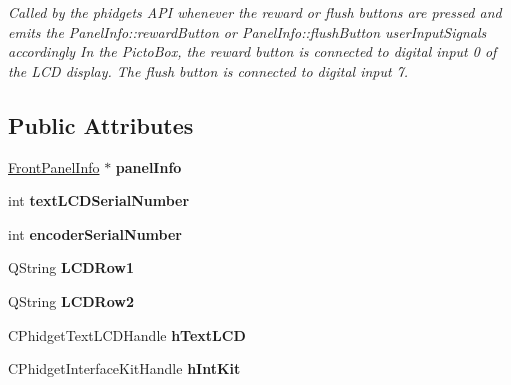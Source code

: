 \begin{DoxyCompactItemize}
\begin{DoxyCompactList}\small\item\em Called by the phidgets A\-P\-I whenever the reward or flush buttons are pressed and emits the Panel\-Info\-::reward\-Button or Panel\-Info\-::flush\-Button user\-Input\-Signals accordingly  In the Picto\-Box, the reward button is connected to digital input 0 of the L\-C\-D display. The flush button is connected to digital input 7. \end{DoxyCompactList}\end{DoxyCompactItemize}
\subsection*{Public Attributes}
\begin{DoxyCompactItemize}
\item 
\hypertarget{class_phidgets_af8d44bc3997410a4684134cfa4b7f96d}{\hyperlink{class_front_panel_info}{Front\-Panel\-Info} $\ast$ {\bfseries panel\-Info}}\label{class_phidgets_af8d44bc3997410a4684134cfa4b7f96d}

\item 
\hypertarget{class_phidgets_a0384f8ff8d21e86205b57c331109378c}{int {\bfseries text\-L\-C\-D\-Serial\-Number}}\label{class_phidgets_a0384f8ff8d21e86205b57c331109378c}

\item 
\hypertarget{class_phidgets_a1bbdcecfa457f37353ef961c6f899b33}{int {\bfseries encoder\-Serial\-Number}}\label{class_phidgets_a1bbdcecfa457f37353ef961c6f899b33}

\item 
\hypertarget{class_phidgets_ad992b047164dda94ced4513033bf3dd3}{Q\-String {\bfseries L\-C\-D\-Row1}}\label{class_phidgets_ad992b047164dda94ced4513033bf3dd3}

\item 
\hypertarget{class_phidgets_a1093ada8d8ae814ff08d42574e1391c0}{Q\-String {\bfseries L\-C\-D\-Row2}}\label{class_phidgets_a1093ada8d8ae814ff08d42574e1391c0}

\item 
\hypertarget{class_phidgets_ae09bd5feecd96927e72c64a8c9d57715}{C\-Phidget\-Text\-L\-C\-D\-Handle {\bfseries h\-Text\-L\-C\-D}}\label{class_phidgets_ae09bd5feecd96927e72c64a8c9d57715}

\item 
\hypertarget{class_phidgets_af4f7f24132d0866cb2ccbe0906104975}{C\-Phidget\-Interface\-Kit\-Handle {\bfseries h\-Int\-Kit}}\label{class_phidgets_af4f7f24132d0866cb2ccbe0906104975}


\end{DoxyCompactItemize}
